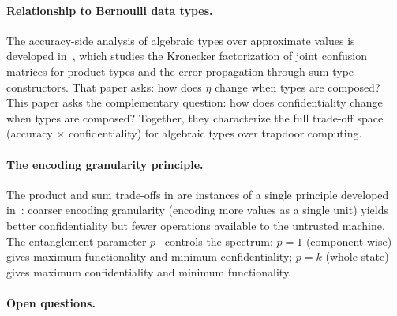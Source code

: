 \documentclass[11pt]{article}
\theoremstyle{definition}
\theoremstyle{plain}
\theoremstyle{remark}
\begin{document}
\paragraph{Relationship to Bernoulli data types.}
The accuracy-side analysis of algebraic types over approximate values is
developed in~\cite{towell2026bernoulli}, which studies the Kronecker
factorization of joint confusion matrices for product types and the error
propagation through sum-type constructors.
That paper asks: how does $\eta$ change when types are composed?
This paper asks the complementary question: how does confidentiality
change when types are composed?
Together, they characterize the full trade-off space (accuracy $\times$
confidentiality) for algebraic types over trapdoor computing.

\paragraph{The encoding granularity principle.}
The product and sum trade-offs in  are
instances of a single principle developed
in~\cite[Sec.~8.1]{towell2026cipher}: coarser encoding granularity
(encoding more values as a single unit) yields better confidentiality but
fewer operations available to the untrusted machine.
The entanglement parameter $p$~\cite[Sec.~8.1]{towell2026cipher} controls
the spectrum: $p = 1$ (component-wise) gives maximum functionality and
minimum confidentiality; $p = k$ (whole-state) gives maximum
confidentiality and minimum functionality.

\paragraph{Open questions.}
\end{document}
